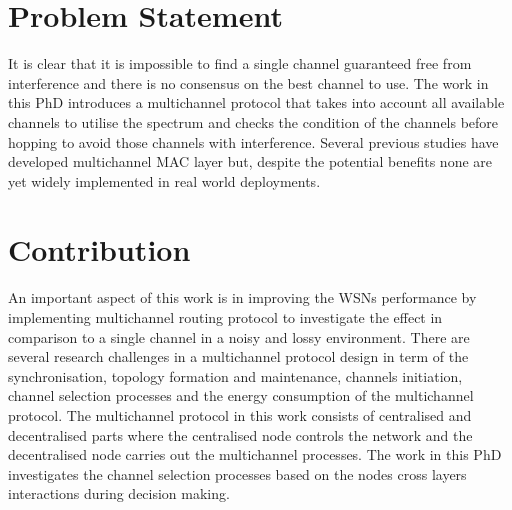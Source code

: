 
\section{Problem Statement}
It is clear that it is impossible to find a single channel guaranteed free from interference and there is no consensus on the best channel to use. The work in this PhD introduces a multichannel protocol that takes into account all available channels to utilise the spectrum and checks the condition of the channels before hopping to avoid those channels with interference. Several previous studies have developed multichannel MAC layer but, despite the potential benefits none are yet widely implemented in real world deployments.

\section{Contribution}
An important aspect of this work is in improving the WSNs performance by implementing multichannel routing protocol to investigate the effect in comparison to a single channel in a noisy and lossy environment. There are several research challenges in a multichannel protocol design in term of the synchronisation, topology formation and maintenance, channels initiation, channel selection processes and the energy consumption of the multichannel protocol. The multichannel protocol in this work consists of centralised and decentralised parts where the centralised node controls the network and the decentralised node carries out the multichannel processes. The work in this PhD investigates the channel selection processes based on the nodes cross layers interactions during decision making.


